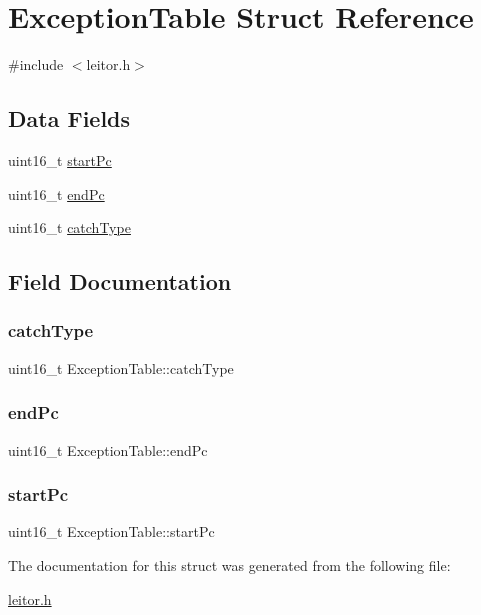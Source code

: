 \hypertarget{structExceptionTable}{}\section{Exception\+Table Struct Reference}
\label{structExceptionTable}


{\ttfamily \#include $<$leitor.\+h$>$}

\subsection*{Data Fields}
\begin{DoxyCompactItemize}
\item 
uint16\+\_\+t \hyperlink{structExceptionTable_a04ab9fcb6779181df0079a864f442e15}{start\+Pc}
\item 
uint16\+\_\+t \hyperlink{structExceptionTable_a89792e3b2a4737f8f2441fed7ec15aac}{end\+Pc}
\item 
uint16\+\_\+t \hyperlink{structExceptionTable_ac9dbcf3326262a17a88c1ed875d6459f}{catch\+Type}
\end{DoxyCompactItemize}


\subsection{Field Documentation}
\mbox{\label{structExceptionTable_ac9dbcf3326262a17a88c1ed875d6459f}} 
\subsubsection{\texorpdfstring{catch\+Type}{catchType}}
{\footnotesize\ttfamily uint16\+\_\+t Exception\+Table\+::catch\+Type}

\mbox{\label{structExceptionTable_a89792e3b2a4737f8f2441fed7ec15aac}} 
\subsubsection{\texorpdfstring{end\+Pc}{endPc}}
{\footnotesize\ttfamily uint16\+\_\+t Exception\+Table\+::end\+Pc}

\mbox{\label{structExceptionTable_a04ab9fcb6779181df0079a864f442e15}} 
\subsubsection{\texorpdfstring{start\+Pc}{startPc}}
{\footnotesize\ttfamily uint16\+\_\+t Exception\+Table\+::start\+Pc}



The documentation for this struct was generated from the following file\+:\begin{DoxyCompactItemize}
\item 
\hyperlink{leitor_8h}{leitor.\+h}\end{DoxyCompactItemize}

